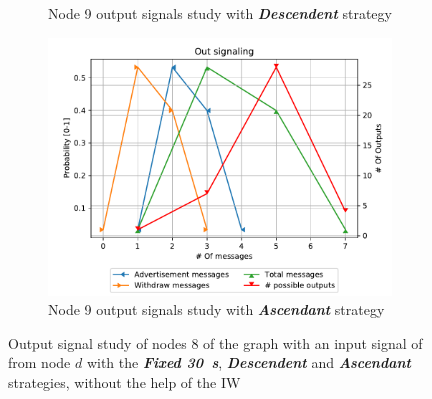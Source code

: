 \begin{figure}[ht]
\begin{subfigure}[b]{0.49\textwidth}
		 \caption{Node \num{9} output signals study with \textbf{\textit{Descendent}} strategy}
         \label{fig:signal_node9_fabrikant_descendent_noiw}
     \end{subfigure}
     \begin{subfigure}[b]{0.49\textwidth}
         \centering
         \includegraphics[width=\textwidth]{images/signal_study/fabrikant/Ascending.pdf}
		 \caption{Node \num{9} output signals study with \textbf{\textit{Ascendant}} strategy}
         \label{fig:signal_node9_fabrikant_ascendant_noIW}
     \end{subfigure}
		\caption{Output signal study of nodes \num{8} of the graph
			 with an input signal of  from node $d$
			with the \textbf{\textit{Fixed \SI{30}{\second}}}, \textbf{\textit{Descendent}}
			and \textbf{\textit{Ascendant}}	strategies, without the help of the \ac{IW}}
        \label{fig:signal_fabrikant}
\end{figure}

